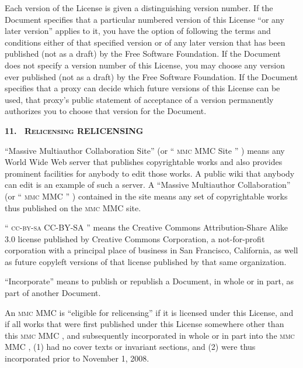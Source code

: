 Each version of the License is given a distinguishing
version number. If the Document specifies that a particular
numbered version of this License \enquote{or any later
  version} applies to it, you have the option of following
the terms and conditions either of that specified version or
of any later version that has been published (not as a
draft) by the Free Software Foundation. If the Document does
not specify a version number of this License, you may choose
any version ever published (not as a draft) by the Free
Software Foundation. If the Document specifies that a proxy
can decide which future versions of this License can be
used, that proxy's public statement of acceptance of a
version permanently authorizes you to choose that version
for the Document.

\medskip
\begin{center}
  \textbf{%
    \Large 11.\
    \ifgfdl@sc
      \textsc{Relicensing}%
    \else
      RELICENSING%
    \fi
  }
\end{center}

\begingroup
\sloppy
\noindent
\enquote{Massive Multiauthor Collaboration Site} (or
\enquote{%
  \ifgfdl@sc
    \textsc{mmc}
  \else
    MMC
  \fi
  Site%
}%
) means any World Wide Web server that
publishes copyrightable works and also provides prominent
facilities for anybody to edit those works. A public wiki
that anybody can edit is an example of such a server. A
\enquote{Massive Multiauthor Collaboration} (or
\enquote{%
  \ifgfdl@sc
    \textsc{mmc}
  \else
    MMC
  \fi
}%
) contained in the site means any set of copyrightable
works thus published on the
\ifgfdl@sc
  \textsc{mmc}
\else
  MMC
\fi
site.
\endgroup

\enquote{%
  \ifgfdl@sc
    \textsc{cc-by-sa}
  \else
    CC-BY-SA
  \fi
} means the Creative Commons Attribution-Share Alike 3.0
license published by Creative Commons Corporation, a
not-for-profit corporation with a principal place of
business in San Francisco, California, as well as future
copyleft versions of that license published by that same
organization.

\enquote{Incorporate} means to publish or republish a
Document, in whole or in part, as part of another Document.

An
\ifgfdl@sc
  \textsc{mmc}
\else
  MMC
\fi
is \enquote{eligible for relicensing} if it is
licensed under this License, and if all works that were
first published under this License somewhere other than this
\ifgfdl@sc
  \textsc{mmc}%
\else
  MMC%
\fi
, and subsequently incorporated in whole or in part into
the
\ifgfdl@sc
  \textsc{mmc}%
\else
  MMC%
\fi
, (1) had no cover texts or invariant sections, and (2) were
thus incorporated prior to November 1, 2008.

